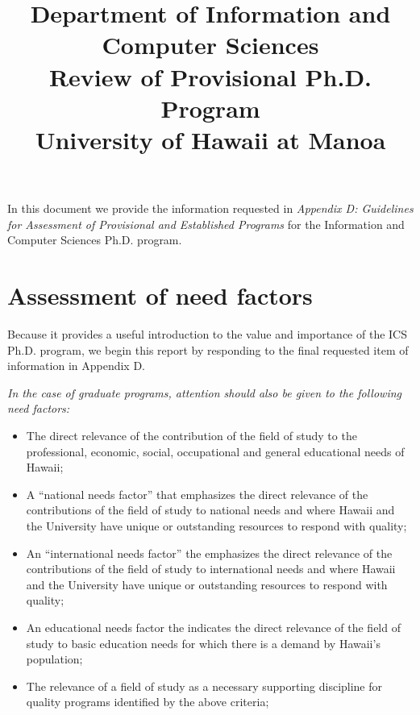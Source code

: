 \documentclass[12pt]{article}
\begin{document}
\title{
       Department of Information and Computer Sciences\\
       {\bf Review of Provisional Ph.D. Program} \\
       University of Hawaii at Manoa}

\maketitle

\tableofcontents

\newpage

In this document we provide the information requested in {\em Appendix D:
Guidelines for Assessment of Provisional and Established Programs} for the
Information and Computer Sciences Ph.D. program.

\section{Assessment of need factors}

Because it provides a useful introduction to the value and importance of the ICS
Ph.D. program, we begin this report by responding to the final requested
item of information in Appendix D.

{\em
\medskip \noindent In the case of graduate programs, attention should also be given to the
following need factors:
\begin{itemize}
\item The direct relevance of the contribution of the field of study to the
  professional, economic, social, occupational and general educational
  needs of Hawaii; 
\item A ``national needs factor'' that emphasizes the direct relevance of
  the contributions of the field of study to national needs and where
  Hawaii and the University have unique or outstanding resources to
  respond with quality;
\item An ``international needs factor'' the emphasizes the direct relevance of
  the contributions of the field of study to international needs and where
  Hawaii and the University have unique or outstanding resources to
  respond with quality;
\item An educational needs factor the indicates the direct relevance of the
  field of study to basic education needs for which there is a demand by
  Hawaii's population;
\item The relevance of a field of study as a necessary supporting
  discipline for quality programs identified by the above criteria;
\end{itemize}
}
\end{document}
